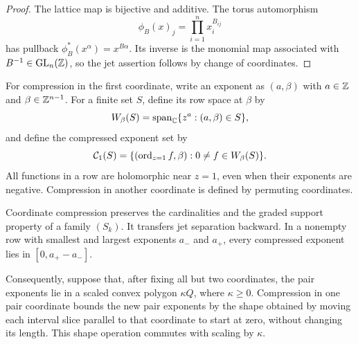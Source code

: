\begin{proof}
The lattice map is bijective and additive. The torus automorphism
\[
 \phi_B(x)_j=\prod_{i=1}^n x_i^{B_{ij}}
\]
has pullback $\phi_B^*(x^\alpha)=x^{B\alpha}$. Its inverse is the
monomial map associated with $B^{-1}\in\operatorname{GL}_n(\mathbb Z)$, so the
jet assertion follows by change of coordinates.
\end{proof}

For compression in the first coordinate, write an exponent as $(a,\beta)$
with $a\in\mathbb Z$ and $\beta\in\mathbb Z^{n-1}$. For a finite set $S$, define its
row space at $\beta$ by
\[
 W_\beta(S)=\operatorname{span}_\mathbb C\{z^a:(a,\beta)\in S\},
\]
and define the compressed exponent set by
\begin{equation}\label{eq:coordinate-compression}
 \mathcal C_1(S)=
 \{(\operatorname{ord}_{z=1}f,\beta):0\ne f\in W_\beta(S)\}.
\end{equation}
All functions in a row are holomorphic near $z=1$, even when their
exponents are negative. Compression in another coordinate is defined by
permuting coordinates.

\begin{lemma}\label{lem:compression}
Coordinate compression preserves the cardinalities and the graded support
property of a family $(S_k)$. It transfers jet separation backward. In a
nonempty row with smallest and largest exponents $a_-$ and $a_+$, every
compressed exponent lies in $[0,a_+-a_-]$.

Consequently, suppose that, after fixing all but two coordinates, the pair
exponents lie in a scaled convex polygon $\kappa Q$, where $\kappa\geq0$.
Compression in one pair coordinate bounds the new pair exponents by the
shape obtained by moving each interval slice parallel to that coordinate
to start at zero, without changing its length. This shape operation commutes
with scaling by $\kappa$.
\end{lemma}

